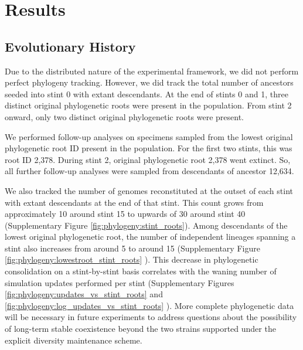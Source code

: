 \section{Results}

\subsection{Evolutionary History}

Due to the distributed nature of the experimental framework, we did not perform perfect phylogeny tracking.
However, we did track the total number of ancestors seeded into stint 0 with extant descendants.
At the end of stints 0 and 1, three distinct original phylogenetic roots were present in the population.
From stint 2 onward, only two distinct original phylogenetic roots were present.

We performed follow-up analyses on specimens sampled from the lowest original phylogenetic root ID present in the population.
For the first two stints, this was root ID 2,378.
During stint 2, original phylogenetic root 2,378 went extinct.
So, all further follow-up analyses were sampled from descendants of ancestor 12,634.

We also tracked the number of genomes reconstituted at the outset of each stint with extant descendants at the end of that stint.
This count grows from approximately 10 around stint 15 to upwards of 30 around stint 40 (Supplementary Figure \ref{fig:phylogeny:stint_roots}\citep{Moreno_2021}).
Among descendants of the lowest original phylogenetic root, the number of independent lineages spanning a stint also increases from around 5 to around 15
(Supplementary Figure \ref{fig:phylogeny:lowestroot_stint_roots} \citep{Moreno_2021}).
This decrease in phylogenetic consolidation on a stint-by-stint basis correlates with the waning number of simulation updates performed per stint (Supplementary Figures \ref{fig:phylogeny:updates_vs_stint_roots} and \ref{fig:phylogeny:log_updates_vs_stint_roots} \citep{Moreno_2021}).
More complete phylogenetic data will be necessary in future experiments to address questions about the possibility of long-term stable coexistence beyond the two strains supported under the explicit     diversity maintenance scheme.


